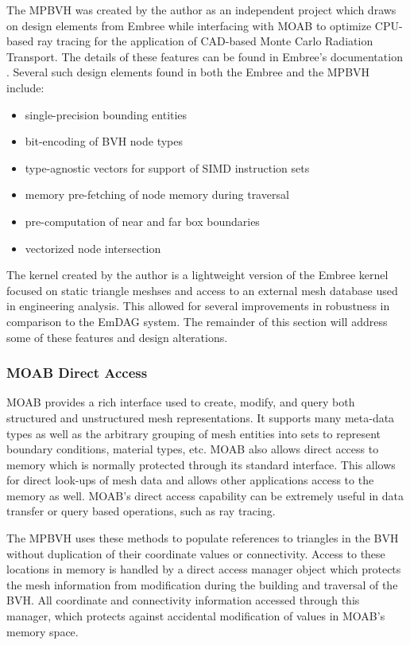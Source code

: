 The MPBVH was created by the author as an independent project which draws on
design elements from Embree while interfacing with MOAB to optimize CPU-based
ray tracing for the application of CAD-based Monte Carlo Radiation
Transport. The details of these features can be found in Embree's documentation
\cite{Embree}. Several such design elements found in both the Embree and the MPBVH
include:

\begin{itemize}
  \item single-precision bounding entities
  \item bit-encoding of BVH node types
  \item type-agnostic vectors for support of SIMD instruction sets
  \item memory pre-fetching of node memory during traversal
  \item pre-computation of near and far box boundaries
  \item vectorized node intersection
\end{itemize}


The kernel created by the author is a lightweight version of the Embree kernel
focused on static triangle meshses and access to an external mesh database used
in engineering analysis. This allowed for several improvements in robustness in
comparison to the EmDAG system. The remainder of this section will address some
of these features and design alterations.

\subsubsection{MOAB Direct Access}

MOAB provides a rich interface used to create, modify, and query both structured
and unstructured mesh representations. It supports many meta-data types as well
as the arbitrary grouping of mesh entities into sets to represent boundary
conditions, material types, etc. MOAB also allows direct access to memory which
is normally protected through its standard interface. This allows for direct
look-ups of mesh data and allows other applications access to the memory as
well. MOAB's direct access capability can be extremely useful in data transfer
or query based operations, such as ray tracing.

The MPBVH uses these methods to populate references to triangles in the BVH
without duplication of their coordinate values or connectivity. Access to these
locations in memory is handled by a direct access manager object which protects
the mesh information from modification during the building and traversal of the
BVH. All coordinate and connectivity information accessed through this manager,
which protects against accidental modification of values in MOAB's memory space.

